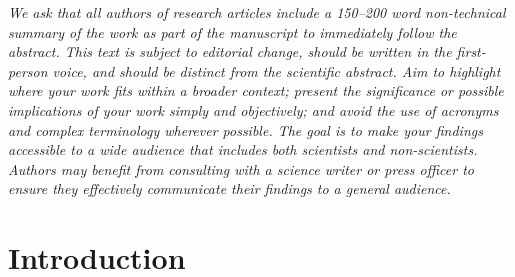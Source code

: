 \documentclass[10pt,letterpaper]{article}
\begin{document}
\emph{We ask that all authors of research articles include a 150–200 word non-technical summary of the work as part of the manuscript to immediately follow the abstract.
This text is subject to editorial change, should be written in the first-person voice, and should be distinct from the scientific abstract.
Aim to highlight where your work fits within a broader context; present the significance or possible implications of your work simply and objectively; and avoid the use of acronyms and complex terminology wherever possible.
The goal is to make your findings accessible to a wide audience that includes both scientists and non-scientists.
Authors may benefit from consulting with a science writer or press officer to ensure they effectively communicate their findings to a general audience.}



\section*{Introduction}
\end{document}
